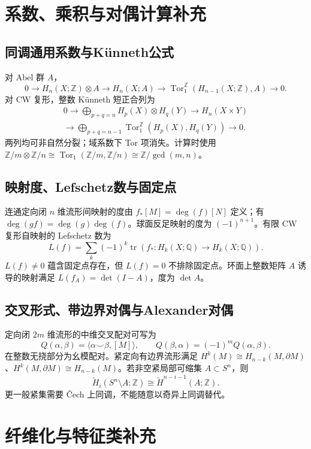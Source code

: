 \documentclass[../main.tex]{subfiles}
\begin{document}
\section{系数、乘积与对偶计算补充}
\subsection{同调通用系数与Künneth公式}
对 Abel 群 $A$，
\[
0\to H_n(X;\mathbb Z)\otimes A\to H_n(X;A)
\to\operatorname{Tor}_1^{\mathbb Z}(H_{n-1}(X;\mathbb Z),A)\to0.
\]
对 CW 复形，整数 Künneth 短正合列为
\begin{gather*}
0\longrightarrow\bigoplus_{p+q=n}H_p(X)\otimes H_q(Y)
\longrightarrow H_n(X\times Y)\\
\longrightarrow\bigoplus_{p+q=n-1}\operatorname{Tor}_1^{\mathbb Z}(H_p(X),H_q(Y))
\longrightarrow0.
\end{gather*}
两列均可非自然分裂；域系数下 Tor 项消失。计算时使用 $\mathbb Z/m\otimes\mathbb Z/n\cong\operatorname{Tor}_1(\mathbb Z/m,\mathbb Z/n)\cong\mathbb Z/\gcd(m,n)$。
\subsection{映射度、Lefschetz数与固定点}
连通定向闭 $n$ 维流形间映射的度由 $f_*[M]=\deg(f)[N]$ 定义；有 $\deg(gf)=\deg(g)\deg(f)$。球面反足映射的度为 $(-1)^{n+1}$。有限 CW 复形自映射的 Lefschetz 数为
\[
L(f)=\sum_k(-1)^k\operatorname{tr}(f_*:H_k(X;\mathbb Q)\to H_k(X;\mathbb Q)).
\]
$L(f)\ne0$ 蕴含固定点存在，但 $L(f)=0$ 不排除固定点。环面上整数矩阵 $A$ 诱导的映射满足 $L(f_A)=\det(I-A)$，度为 $\det A$。
\subsection{交叉形式、带边界对偶与Alexander对偶}
定向闭 $2m$ 维流形的中维交叉配对可写为
\[
Q(\alpha,\beta)=\langle\alpha\smile\beta,[M]\rangle,\qquad
Q(\beta,\alpha)=(-1)^mQ(\alpha,\beta).
\]
在整数无挠部分为幺模配对。紧定向有边界流形满足 $H^k(M)\cong H_{n-k}(M,\partial M)$、$H^k(M,\partial M)\cong H_{n-k}(M)$。若非空紧局部可缩集 $A\subset S^n$，则
\[
\widetilde H_i(S^n\setminus A;\mathbb Z)\cong\widetilde H^{n-i-1}(A;\mathbb Z).
\]
更一般紧集需要 Čech 上同调，不能随意以奇异上同调替代。
\section{纤维化与特征类补充}
\end{document}
